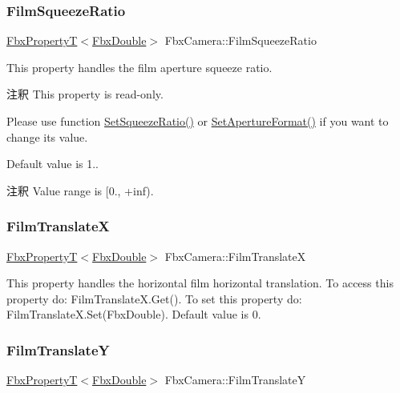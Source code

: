 \subsubsection{\texorpdfstring{Film\+Squeeze\+Ratio}{FilmSqueezeRatio}}
{\footnotesize\ttfamily \hyperlink{class_fbx_property_t}{Fbx\+PropertyT}$<$\hyperlink{fbxtypes_8h_a171e72a1c46fc15c1a6c9c31948c1c5b}{Fbx\+Double}$>$ Fbx\+Camera\+::\+Film\+Squeeze\+Ratio}

This property handles the film aperture squeeze ratio.

\begin{DoxyRemark}{注釈}
This property is read-\/only. 

Please use function \hyperlink{class_fbx_camera_a4ef18832cc863f5dcc086d0d10686122}{Set\+Squeeze\+Ratio()} or \hyperlink{class_fbx_camera_a5b644b41e4d72c214acfdb5a2dee7576}{Set\+Aperture\+Format()} if you want to change its value.
\end{DoxyRemark}
Default value is 1.. \begin{DoxyRemark}{注釈}
Value range is \mbox{[}0., +inf). 
\end{DoxyRemark}
\mbox{\label{class_fbx_camera_af0c221000e5299efd1e91408bb4d96b6}} 
\subsubsection{\texorpdfstring{Film\+TranslateX}{FilmTranslateX}}
{\footnotesize\ttfamily \hyperlink{class_fbx_property_t}{Fbx\+PropertyT}$<$\hyperlink{fbxtypes_8h_a171e72a1c46fc15c1a6c9c31948c1c5b}{Fbx\+Double}$>$ Fbx\+Camera\+::\+Film\+TranslateX}

This property handles the horizontal film horizontal translation. To access this property do\+: Film\+Translate\+X.\+Get(). To set this property do\+: Film\+Translate\+X.\+Set(\+Fbx\+Double). Default value is 0. \mbox{\label{class_fbx_camera_ab2fed4f94b108161a382cb53ecc9bc14}} 
\subsubsection{\texorpdfstring{Film\+TranslateY}{FilmTranslateY}}
{\footnotesize\ttfamily \hyperlink{class_fbx_property_t}{Fbx\+PropertyT}$<$\hyperlink{fbxtypes_8h_a171e72a1c46fc15c1a6c9c31948c1c5b}{Fbx\+Double}$>$ Fbx\+Camera\+::\+Film\+TranslateY}

